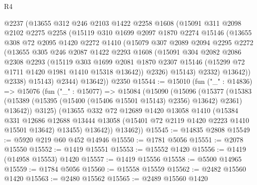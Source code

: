 \begin{lexlean}{R4}
\begin{coremodule}
          @2237
          (@13655
            @312
            @246
            @2103
            @1422
            @2258
            @1608
            (@15091
              @311
              @2098
              @2102
              @2275
              @2258
              (@15119
                @310
                @1699
                @2097
                @1870
                @2274
                @15146
                (@13655
                  @308
                  @72
                  @2095
                  @1420
                  @2272
                  @1410
                  (@15079
                    @307
                    @2089
                    @2094
                    @2295
                    @2272
                    (@13655
                      @305
                      @246
                      @2087
                      @1422
                      @2293
                      @1608
                      (@15091
                        @304
                        @2082
                        @2086
                        @2308
                        @2293
                        (@15119
                          @303
                          @1699
                          @2081
                          @1870
                          @2307
                          @15146
                          (@15299 @72 @1711 @1420 @1981 @1410 @15318 @13642))
                        @2326)
                      @15143)
                    @2332)
                  @13642))
              @2338)
            @15143)
          @2344)
        @13642))
    @2350
@15544 := @15010
    (fun ("_" : @14836) =>
    @15076
      (fun ("_" : @15077) =>
      @15084
        (@15090
          (@15096
            (@15377
              (@15383 (@15389 (@15395 (@15400 (@15406 @15501 @15143) @2356) @13642) @2361) @13642))
            @3125)
          (@13655
            @332
            @72
            @12689
            @1420
            @13058
            @1410
            (@15384
              @331
              @12686
              @12688
              @13444
              @13058
              (@15401 @72 @2119 @1420 @2223 @1410 @15501 @13642)
              @13455)
            @13642))
        @13462))
@15545 := @14835 @2808
@15549 := @5920 @219 @60 @452 @14946
@15550 := @1781 @5056
@15551 := @2078 @15550
@15552 := @1419 @15551
@15553 := @15552 @1420
@15556 := @1419 (@14958 @15553) @1420
@15557 := @1419 @15556
@15558 := @5500 @14965
@15559 := @1784 @5056
@15560 := @15558 @15559
@15562 := @2482 @15560 @1420
@15563 := @2480 @15562
@15565 := @2489 @15560 @1420

\end{coremodule}
\end{lexlean}
